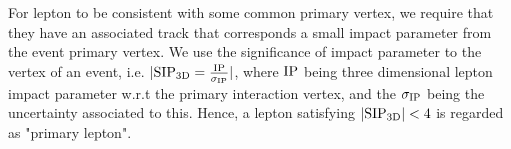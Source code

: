  For lepton to be consistent with some common primary vertex, we require that they have an associated track that corresponds a small impact parameter from the event primary vertex.  
We use the significance of impact parameter to the vertex of an event, i.e. $ | {\rm SIP_{3D}} = \frac{\rm IP}{\sigma_{\rm IP}} |$, where ${\rm IP}$ being three dimensional lepton impact parameter w.r.t the primary interaction vertex, and the $\sigma_{\rm IP}$ being the uncertainty associated to this.  Hence, a lepton satisfying $| {\rm SIP_{3D}} | < 4$ is regarded as "primary lepton".               
